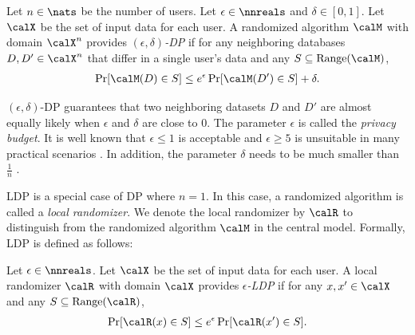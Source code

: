\begin{definition}  \label{def:DP} 
Let $n \in \nats$ be the number of users. 
Let $\epsilon \in \nnreals$ and $\delta \in [0,1]$. 
Let $\calX$ be the set of input data for each user. 
A randomized algorithm $\calM$ with domain $\calX^n$ 
provides \emph{$(\epsilon,\delta)$-DP} if for any neighboring databases $D,D' \in \calX^n$ that differ in a single user's data and any 
$S \subseteq \mathrm{Range}(\calM)$, 
\begin{align*}
\Pr[\calM(D) \in S] \leq e^\epsilon \Pr[\calM(D') \in S] + \delta.
\end{align*}
\end{definition}
$(\epsilon,\delta)$-DP guarantees that two neighboring datasets $D$ and $D'$ are almost equally likely when $\epsilon$ and $\delta$ are close to $0$. 
The parameter $\epsilon$ is called the \textit{privacy budget}. 
It is well known that $\epsilon \leq 1$ is acceptable and $\epsilon \geq 5$ is unsuitable in many practical scenarios \cite{DP_Li}. 
In addition, the parameter $\delta$ needs to be much smaller than $\frac{1}{n}$ \cite{Barber_arXiv14,DP}. 

LDP \cite{Kasiviswanathan_FOCS08} is a special case of DP where $n=1$. 
In this case, a randomized algorithm is called a \textit{local randomizer}. 
We denote the local randomizer by $\calR$ to distinguish from the randomized algorithm $\calM$ in the central model. 
Formally, LDP is defined as follows: 
\begin{definition}  \label{def:LDP} 
Let $\epsilon \in \nnreals$. 
Let $\calX$ be the set of input data for each user. 
A local randomizer $\calR$ with domain $\calX$ 
provides \emph{$\epsilon$-LDP} if for any $x,x' \in \calX$ and any $S \subseteq \mathrm{Range}(\calR)$, 
\begin{align}
\Pr[\calR(x) \in S] \leq e^\epsilon \Pr[\calR(x') \in S].
\label{eq:LDP}
\end{align}
\end{definition}

